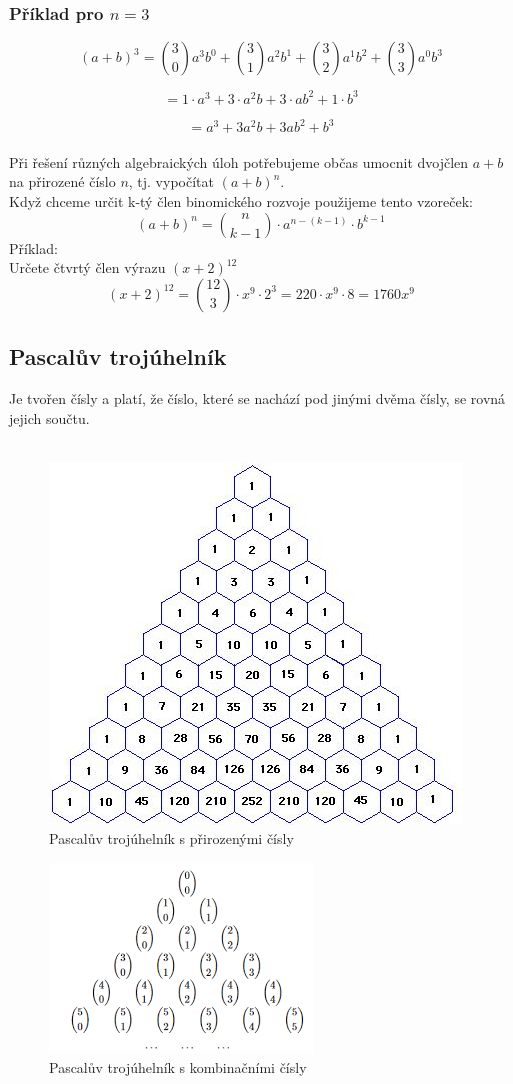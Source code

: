 \subsubsection{Příklad pro $n = 3$}

\[
(a + b)^3 = \binom{3}{0}a^3b^0 + \binom{3}{1}a^2b^1 + \binom{3}{2}a^1b^2 + \binom{3}{3}a^0b^3
\]

\[
= 1 \cdot a^3 + 3 \cdot a^2b + 3 \cdot ab^2 + 1 \cdot b^3
\]

\[
= a^3 + 3a^2b + 3ab^2 + b^3
\]
\\
     Při řešení různých algebraických úloh potřebujeme občas umocnit dvojčlen $a+b$ na přirozené číslo $n$, tj. vypočítat $(a+b)^n$.\\
     Když chceme určit k-tý člen binomického rozvoje použijeme tento vzoreček:
     $$
     (a+b)^n={n \choose k-1}\cdot a^{n-(k-1)}\cdot b^{k-1}
     $$
     Příklad:\\
     Určete čtvrtý člen výrazu $(x+2)^{12}$
     $$
     (x+2)^{12}={12 \choose 3}\cdot x^9\cdot 2^3=220\cdot x^9 \cdot8=1760x^9
     $$
     \subsection{Pascalův trojúhelník}
     Je tvořen čísly a platí, že číslo, které se nachází pod jinými dvěma čísly, se rovná jejich součtu.\\
     \\

\begin{figure}[H]
        \centering
        \includegraphics[width=0.4\linewidth]{img/21_pascaluvTrojuhelnik1_realny.jpg}
        \caption{Pascalův trojúhelník s přirozenými čísly} 
        \label{fig:enter-label}
    \end{figure}

\begin{figure}[H]
        \centering
        \includegraphics[width=0.4\linewidth]{img/21_paskal_kombinacni_cisla.png}
        \caption{Pascalův trojúhelník s kombinačními čísly} 
        \label{fig:enter-label}
    \end{figure}
    
